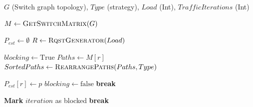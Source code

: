 \begin{algorithm}[H]
    \caption{Incremental experiment of blocking rate}
    \label{alg:incremental_experiment}
    \begin{algorithmic}[1]
        \Require $G$ (Switch graph topology), $Type$ (strategy), $Load$ (Int), $TrafficIterations$ (Int)

        \State $M \gets \Call{GetSwitchMatrix}{G}$

        \State $P_{est} \gets \emptyset$
        \State $R \gets \Call{RqstGenerator}{Load}$

        \State $blocking \gets \text{True}$
        \State $Paths \gets M[r]$
        \State $SortedPaths \gets \Call{RearrangePaths}{Paths, Type}$

        \State $P_{est}[r] \gets p$
        \State $blocking \gets \text{false}$
        \State \textbf{break}
        \EndIf
        \EndFor

        \State \textbf{Mark} $iteration$ as blocked
        \State \textbf{break}
        \EndIf
        \EndFor
        \EndFor
    \end{algorithmic}
\end{algorithm}

